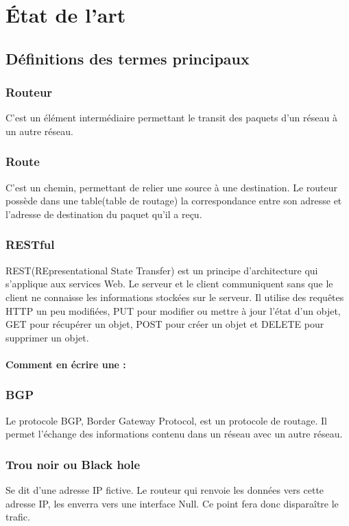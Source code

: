 \chapter{État de l'art}

\section{Définitions des termes principaux}

\subsection{Routeur}
C'est un élément intermédiaire permettant le transit des paquets d'un réseau à un autre réseau.

\subsection{Route}
C'est un chemin, permettant de relier une source à une destination. Le routeur possède dans une table(table de routage) la correspondance entre son adresse et l'adresse de destination du paquet qu'il a reçu.

\subsection{RESTful}
REST(REpresentational State Transfer) est un principe d'architecture qui s'applique aux services Web. Le serveur et le client communiquent sans que le client ne connaisse les informations stockées sur le serveur. Il utilise des requêtes HTTP un peu modifiées, PUT pour modifier ou mettre à jour l'état d'un objet, GET pour récupérer un objet, POST pour créer un objet et DELETE pour supprimer un objet.

\subsubsection{Comment en écrire une :}


\subsection{BGP}
Le protocole BGP, Border Gateway Protocol, est un protocole de routage. Il permet l'échange des informations contenu dans un réseau avec un autre réseau.

\subsection{Trou noir ou Black hole}
Se dit d'une adresse IP fictive. Le routeur qui renvoie les données vers cette adresse IP, les enverra vers une interface Null. Ce point fera donc disparaître le trafic.

